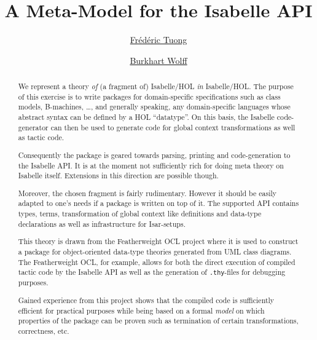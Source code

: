 \documentclass[fontsize=11pt,paper=a4,open=right,twoside,abstract=true]{scrreprt}
\begin{document}
\title{A Meta-Model for the Isabelle API}
\author{%
  \href{https://www.lri.fr/~tuong/}{Fr\'ed\'eric Tuong}
  \and
  \href{https://www.lri.fr/~wolff/}{Burkhart Wolff}}
\publishers{%
  \mbox{LRI, Univ. Paris-Sud, CNRS, CentraleSup\'elec, Universit\'e Paris-Saclay} \\
  b\^at. 650 Ada Lovelace, 91405 Orsay, France \texorpdfstring{\\}{}
    \href{mailto:"Frederic Tuong"
    <frederic.tuong@lri.fr>}{frederic.tuong@lri.fr} \hspace{4.5em}
    \href{mailto:"Burkhart Wolff"
    <burkhart.wolff@lri.fr>}{burkhart.wolff@lri.fr} \\[2em]
  IRT SystemX\\
  8 av.~de la Vauve, 91120 Palaiseau, France \texorpdfstring{\\}{}
    \href{mailto:"Frederic Tuong"
    <frederic.tuong@irt-systemx.fr>}{frederic.tuong@irt-systemx.fr} \quad
    \href{mailto:"Burkhart Wolff"
    <burkhart.wolff@irt-systemx.fr>}{burkhart.wolff@irt-systemx.fr}
}

\maketitle

\begin{abstract}
We represent a theory \emph{of} (a fragment of) Isabelle/HOL \emph{in}
Isabelle/HOL. The purpose of this exercise is to write packages for
domain-specific specifications such as class models, B-machines,
\dots, and generally speaking, any domain-specific languages whose
abstract syntax can be defined by a HOL ``datatype''. On this basis, the
Isabelle code-generator can then be used to generate code for global
context transformations as well as tactic code.

Consequently the package is geared towards 
parsing, printing and code-generation to the Isabelle API.
It is at the moment not sufficiently rich for doing meta theory on 
Isabelle itself. Extensions in this direction are possible though.

Moreover, the chosen fragment is fairly rudimentary. However it should be 
easily adapted to one's needs if a package is written on top of it.
The supported API contains types, terms, transformation of
global context like definitions and data-type declarations as well
as infrastructure for Isar-setups.

This theory is drawn from the Featherweight OCL\cite{brucker.ea:featherweight:2014} project where 
it is used to construct a package for object-oriented data-type theories
generated from UML class diagrams. The Featherweight OCL, for example, allows for 
both the direct execution of compiled tactic code by the Isabelle API
as well as the generation of \verb|.thy|-files for debugging purposes.

Gained experience from this project shows that the compiled code is sufficiently
efficient for practical purposes while being based on a formal \emph{model}
on which properties of the package can be proven such as termination of certain
transformations, correctness, etc.
\end{abstract}
\tableofcontents
\end{document}
